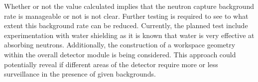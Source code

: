 Whether or not the value calculated implies that the neutron capture background rate is manageable or not is not clear. 
Further testing is required to see to what extent this background rate can be reduced.
Currently, the planned test include experimentation with water shielding as it is known that water is very effective at absorbing neutrons.
Additionally, the construction of a workspace geometry within the overall detector module is being considered.
This approach could potentially reveal if different areas of the detector require more or less surveillance in the presence of given backgrounds.















